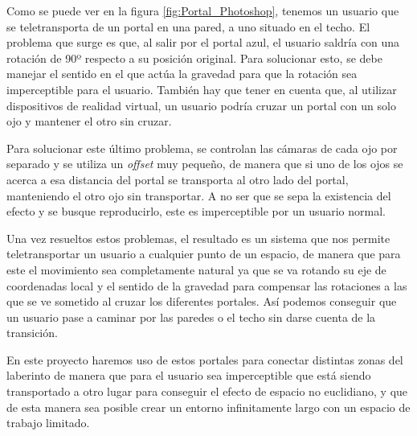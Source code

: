 \documentclass[../main.tex]{subfiles}
\begin{document}
Como se puede ver en la figura \ref{fig:Portal_Photoshop}, tenemos un usuario que se teletransporta de un portal en una pared, a uno situado en el techo. El problema que surge es que, al salir por el portal azul, el usuario saldría con una rotación de 90º respecto a su posición original. Para solucionar esto, se debe manejar el sentido en el que actúa la gravedad para que la rotación sea imperceptible para el usuario. También hay que tener en cuenta que, al utilizar dispositivos de realidad virtual, un usuario podría cruzar un portal con un solo ojo y mantener el otro sin cruzar.

Para solucionar este último problema, se controlan las cámaras de cada ojo por separado y se utiliza un \textit{offset} muy pequeño, de manera que si uno de los ojos se acerca a esa distancia del portal se transporta al otro lado del portal, manteniendo el otro ojo sin transportar. A no ser que se sepa la existencia del efecto y se busque reproducirlo, este es imperceptible por un usuario normal.

Una vez resueltos estos problemas, el resultado es un sistema que nos permite teletransportar un usuario a cualquier punto de un espacio, de manera que para este el movimiento sea completamente natural ya que se va rotando su eje de coordenadas local y el sentido de la gravedad para compensar las rotaciones a las que se ve sometido al cruzar los diferentes portales. Así podemos conseguir que un usuario pase a caminar por las paredes o el techo sin darse cuenta de la transición.

En este proyecto haremos uso de estos portales para conectar distintas zonas del laberinto de manera que para el usuario sea imperceptible que está siendo transportado a otro lugar para conseguir el efecto de espacio no euclidiano, y que de esta manera sea posible crear un entorno infinitamente largo con un espacio de trabajo limitado.
\end{document}
